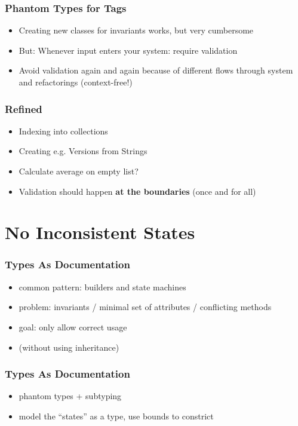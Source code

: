 \documentclass{beamer}
\begin{document}
\begin{frame}
  \frametitle{Phantom Types for Tags}
  \begin{itemize}
  \item Creating new classes for invariants works, but very cumbersome
  \item But: Whenever input enters your system: require validation
  \item Avoid validation again and again because of different flows
    through system and refactorings (context-free!)
  \end{itemize}
\end{frame}

\begin{frame}
  \frametitle{Refined}
  \begin{itemize}
  \item Indexing into collections
  \item Creating e.g. Versions from Strings
  \item Calculate average on empty list?
  \item Validation should happen \textbf{at the boundaries} (once and
    for all)
  \end{itemize}
\end{frame}

\section{No Inconsistent States}

\begin{frame}
  \frametitle{Types As Documentation}
  \begin{itemize}
  \item common pattern: builders and state machines
  \item problem: invariants / minimal set of attributes / conflicting
    methods
  \item goal: only allow correct usage
  \item (without using inheritance)
  \end{itemize}
\end{frame}

\begin{frame}
  \frametitle{Types As Documentation}
  \begin{itemize}
  \item phantom types + subtyping
  \item model the ``states'' as a type, use bounds to constrict
  \end{itemize}
\end{frame}
\end{document}
